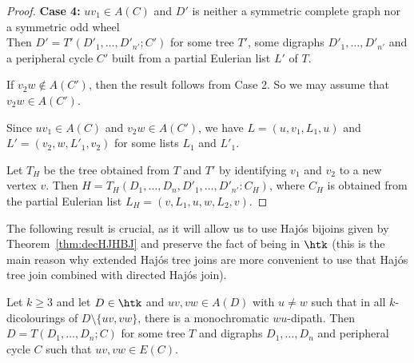 \begin{proof}
    \noindent\textbf{Case 4:} $uv_1 \in A(C)$ and $D'$ is neither a symmetric complete graph nor a symmetric odd wheel\\
    Then $D' = T'(D'_1, \dots, D'_{n'};C')$ for some tree $T'$, some digraphs $D'_1, \dots, D'_{n'}$ and a peripheral cycle $C'$ built from a partial Eulerian list $L'$ of $T$.  

    If $v_2w \notin A(C')$, then the result follows from Case 2. So we may assume that $v_2w \in A(C')$. 

    Since $uv_1 \in A(C)$ and $v_2w \in A(C')$, we have $L=(u,v_1, L_1, u)$ and $L'=(v_2,w,L'_1, v_2)$ for some lists $L_1$ and $L'_1$. 
    
    Let $T_H$ be the tree obtained from $T$ and $T'$ by identifying $v_1$ and $v_2$ to a new vertex $v$. 
    Then $H=T_H(D_1, \dots, D_n,D'_1, \dots, D'_{n'}: C_H)$, where $C_H$ is obtained from the partial Eulerian list $L_H=(v, L_1, u, w, L_2, v)$. 
\end{proof}







The following result is crucial, as it will allow us to use Haj\'os bijoins given by Theorem~\ref{thm:decHJHBJ} and preserve the fact of being in $\htk$ (this is the main reason why extended Haj\'os tree joins are more convenient to use that Haj\'os tree join combined with directed Haj\'os join).

\begin{lemma}\label{lem:P3_in_peripheral}
    Let $k \geq 3$ and let $D \in \htk$ and $uv, vw \in A(D)$ with $u \neq w$ such that in all $k$-dicolourings of $D \setminus \{uv, vw\}$, there is a monochromatic $wu$-dipath. 
    Then $D=T(D_1, \dots, D_n;C)$ for some tree $T$ and digraphs $D_1, \dots, D_n$ and peripheral cycle $C$ such that $uv, vw \in E(C)$.  
\end{lemma}

